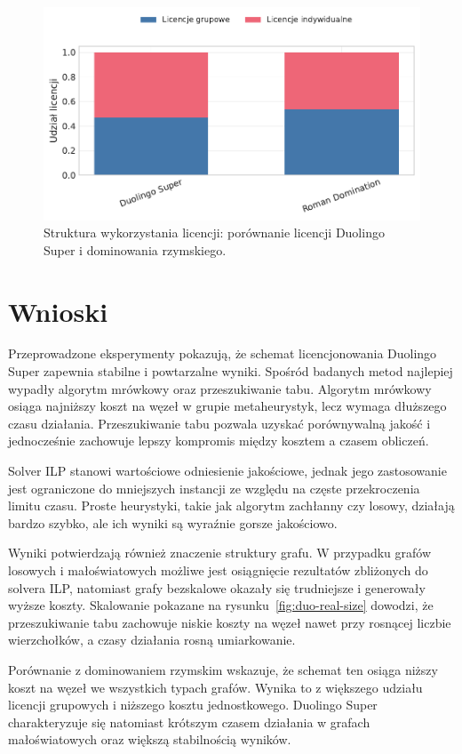 \begin{figure}[H]
  \centering
  \includegraphics[width=0.6\linewidth]{assets/figures/benchmark/synthetic/license_mix_duo_vs_roman.pdf}
  \caption{Struktura wykorzystania licencji: porównanie licencji Duolingo Super i dominowania rzymskiego.}
  \label{fig:duo-roman-license}
\end{figure}

\section{Wnioski}

Przeprowadzone eksperymenty pokazują, że schemat licencjonowania Duolingo Super zapewnia stabilne i powtarzalne wyniki. Spośród badanych metod najlepiej wypadły algorytm mrówkowy oraz przeszukiwanie tabu. Algorytm mrówkowy osiąga najniższy koszt na węzeł w grupie metaheurystyk, lecz wymaga dłuższego czasu działania. Przeszukiwanie tabu pozwala uzyskać porównywalną jakość i jednocześnie zachowuje lepszy kompromis między kosztem a czasem obliczeń.

Solver ILP stanowi wartościowe odniesienie jakościowe, jednak jego zastosowanie jest ograniczone do mniejszych instancji ze względu na częste przekroczenia limitu czasu. Proste heurystyki, takie jak algorytm zachłanny czy losowy, działają bardzo szybko, ale ich wyniki są wyraźnie gorsze jakościowo.

Wyniki potwierdzają również znaczenie struktury grafu. W przypadku grafów losowych i małoświatowych możliwe jest osiągnięcie rezultatów zbliżonych do solvera ILP, natomiast grafy bezskalowe okazały się trudniejsze i generowały wyższe koszty. Skalowanie pokazane na rysunku~\ref{fig:duo-real-size} dowodzi, że przeszukiwanie tabu zachowuje niskie koszty na węzeł nawet przy rosnącej liczbie wierzchołków, a czasy działania rosną umiarkowanie.

Porównanie z dominowaniem rzymskim wskazuje, że schemat ten osiąga niższy koszt na węzeł we wszystkich typach grafów. Wynika to z większego udziału licencji grupowych i niższego kosztu jednostkowego. Duolingo Super charakteryzuje się natomiast krótszym czasem działania w grafach małoświatowych oraz większą stabilnością wyników.
